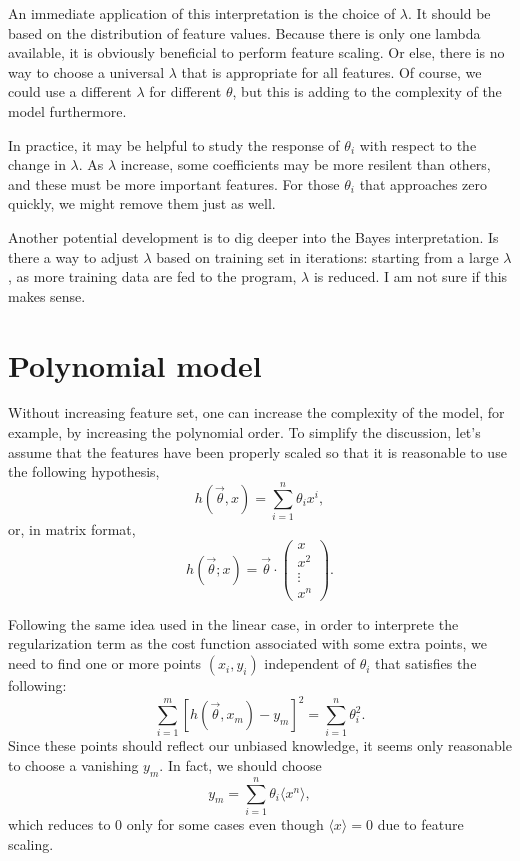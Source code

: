 An immediate application of this interpretation is the choice of $\lambda$. It should be based on the distribution of feature values. Because there is only
one lambda available, it is obviously beneficial to perform feature scaling. Or else, there is no way to choose a universal $\lambda$ that is appropriate 
for all features. Of course, we could use a different $\lambda$ for different $\theta$, but this is adding to the complexity of the model furthermore. 

In practice, it may be helpful to study the response of $\theta_i$ with respect to the change in $\lambda$. As $\lambda$ increase, some coefficients may 
be more resilent than others, and these must be more important features. For those $\theta_i$ that approaches zero quickly, we might 
remove them just as well.


Another potential development is to dig deeper into the Bayes interpretation. Is there a way to adjust $\lambda$ based on training set
in iterations: starting from a large $\lambda$, as more training data are fed to the program, $\lambda$ is reduced. I am not sure if this makes sense.


\section{Polynomial model}
Without increasing feature set, one can increase the complexity of the model, for example, by increasing the polynomial order. To simplify the discussion, let's assume that the features have been properly scaled so that it is reasonable to use the following hypothesis,
\begin{equation}
h(\vec\theta, x) = \sum_{i=1}^n\theta_ix^i,
\end{equation}
or, in matrix format,
\begin{equation}
h(\vec\theta; x) =\vec\theta\cdot\begin{pmatrix}
x\\x^2\\\vdots\\x^n
\end{pmatrix}.
\end{equation}

Following the same idea used in the linear case, in order to interprete the regularization term as the cost function associated with some extra points, we need to find one or more points $(x_i, y_i)$ independent of $\theta_i$ that satisfies the following:
\begin{equation}
\sum_{i=1}^{m}\left[h(\vec\theta,x_m)-y_m\right]^2 = \sum_{i=1}^n\theta_i^2.
\label{eqn:polycost}
\end{equation}
Since these points should reflect our unbiased knowledge, it seems only reasonable to choose a vanishing $y_m$. In fact, we should choose
\begin{equation}
y_m = \sum_{i=1}^n\theta_i\langle x^n\rangle,
\end{equation}
which reduces to 0 only for some cases even though $\langle x\rangle=0$ due to feature scaling.

